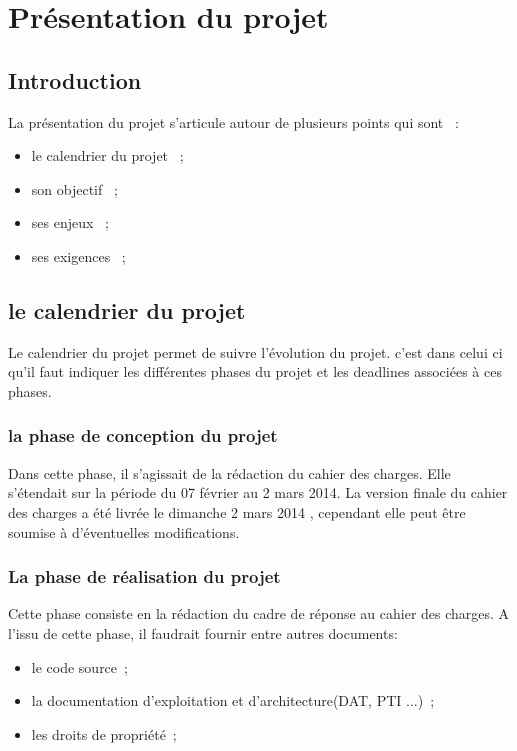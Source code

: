 \chapter{Présentation du projet}

% 

\section{Introduction}
La présentation du projet s'articule autour de plusieurs points qui sont ~: 
\begin{itemize}
   \item le calendrier du projet ~;
   \item son objectif ~;
   \item ses enjeux ~;
   \item ses exigences ~;
\end{itemize}

\section{le calendrier du projet}
Le calendrier du projet permet de suivre l'évolution du projet. c'est dans celui ci qu'il faut indiquer les différentes phases du projet et les deadlines associées à ces phases.

\subsection{la phase de conception du projet}
Dans cette phase, il s'agissait de la rédaction du cahier des charges. Elle s'étendait sur la période du 07 février au 2 mars 2014. La version finale du cahier des charges a été livrée le dimanche 2 mars 2014 , cependant elle peut être soumise à d'éventuelles modifications. 

\subsection{La phase de réalisation du projet}
Cette phase consiste en la rédaction du cadre de réponse au cahier des charges. A l'issu de cette phase, il faudrait fournir entre autres documents:
  \begin{itemize}
    \item le code source~;
    \item la documentation d'exploitation et d'architecture(DAT, PTI ...)~;
    \item les droits de propriété~;
  \end{itemize}

